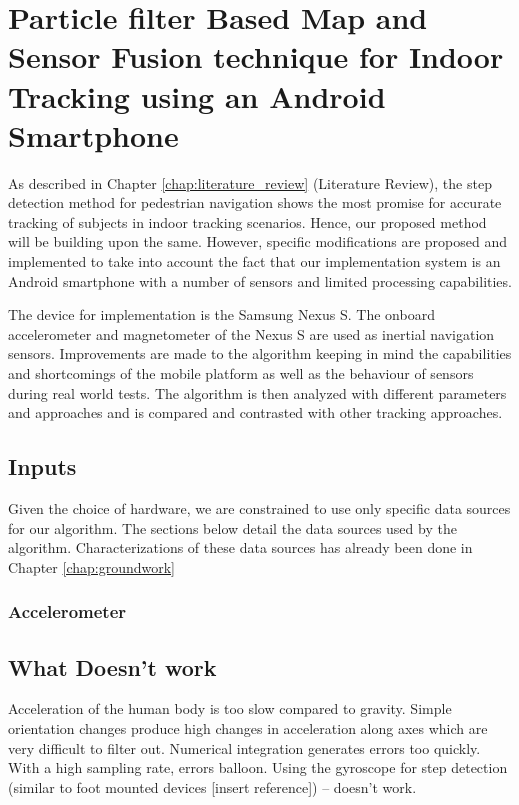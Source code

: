 \chapter[Proposed Work]{Particle filter Based Map and Sensor Fusion technique for Indoor Tracking 
using an Android Smartphone \label{chap:proposed_method}}

As described in Chapter \ref{chap:literature_review} (Literature Review),
the step detection method for pedestrian navigation shows the most promise
for accurate tracking of subjects in indoor tracking scenarios. 
Hence, our proposed method will be building upon the same. However, specific
modifications are proposed and implemented to take into account the fact 
that our implementation system is an Android smartphone with a number of 
sensors and limited processing capabilities. 

The device for implementation is the Samsung Nexus S. The onboard accelerometer 
and magnetometer of the Nexus S are used as inertial navigation sensors.
Improvements are made to the algorithm keeping in mind the capabilities and
shortcomings of the mobile platform as well as the behaviour of sensors during
real world tests. The algorithm is then analyzed with
different parameters and approaches and is compared and contrasted with other
tracking approaches.

\section{Inputs}

Given the choice of hardware, we are constrained to use only specific 
data sources for our algorithm. The sections below detail the data 
sources used by the algorithm. Characterizations of these data sources
has already been done in Chapter \ref{chap:groundwork}

\subsection{Accelerometer}


\section{What Doesn’t work}
Acceleration of the human body is too slow compared to gravity. Simple orientation changes produce high changes in acceleration along axes which are very difficult to filter out.
Numerical integration generates errors too quickly. With a high sampling rate, errors balloon.
Using the gyroscope for step detection (similar to foot mounted devices [insert reference]) – doesn’t work.


